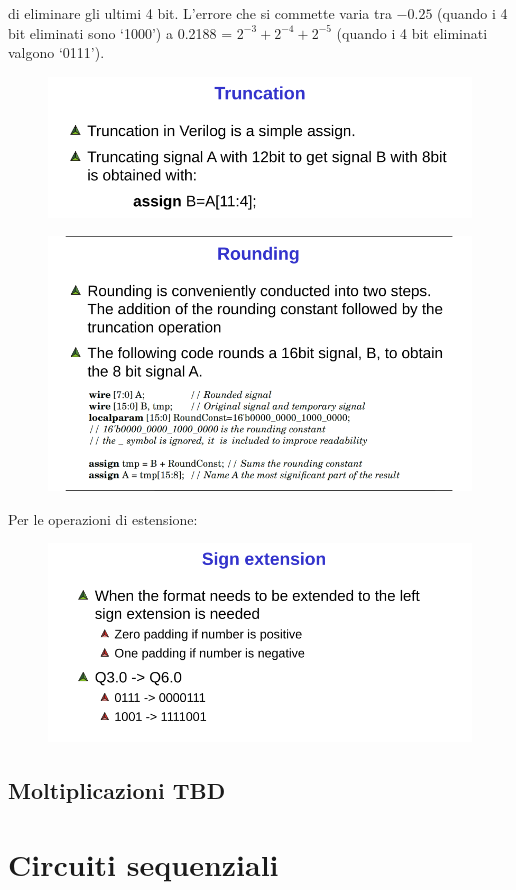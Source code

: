 \documentclass{book}
\begin{document}
        di eliminare gli ultimi 4 bit. L’errore che si commette varia tra $-0.25$ (quando i 4 bit eliminati sono ‘1000’) a 0.2188 = $2^{-3} +2^{-4} +2^{-5}$ (quando i 4 bit eliminati valgono ‘0111’).
        \begin{figure}[h!]
            \centering
            \includegraphics[width=0.65\linewidth]{img/chapt10img7.png}
        \end{figure}
        \begin{figure}[h!]
            \centering
            \includegraphics[width=0.65\linewidth]{img/chapt10img8.png}
        \end{figure}
        Per le operazioni di estensione:
        \begin{figure}[h!]
            \centering
            \includegraphics[width=0.5\linewidth]{img/chapt10img9.png}
        \end{figure}
    \section{Moltiplicazioni TBD}

\chapter{Circuiti sequenziali}
\end{document}
